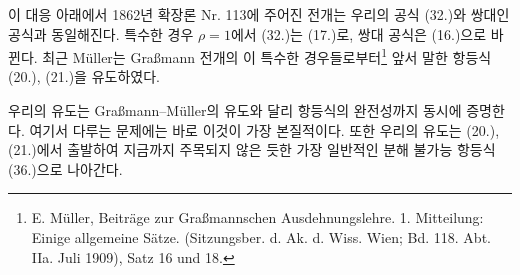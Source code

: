 이 대응 아래에서 1862년 확장론 Nr. 113에 주어진 전개는 우리의 공식 (32.)와 쌍대인 공식과 동일해진다. 특수한 경우 $\rho=1$에서 (32.)는 (17.)로, 쌍대 공식은 (16.)으로 바뀐다. 최근 Müller는 Graßmann 전개의 이 특수한 경우들로부터\footnote{E. Müller, Beiträge zur Graßmannschen Ausdehnungslehre. 1. Mitteilung: Einige allgemeine Sätze. (Sitzungsber. d. Ak. d. Wiss. Wien; Bd. 118. Abt. IIa. Juli 1909), Satz 16 und 18.} 앞서 말한 항등식 (20.), (21.)을 유도하였다.

우리의 유도는 Graßmann--Müller의 유도와 달리 항등식의 완전성까지 동시에 증명한다. 여기서 다루는 문제에는 바로 이것이 가장 본질적이다. 또한 우리의 유도는 (20.), (21.)에서 출발하여 지금까지 주목되지 않은 듯한 가장 일반적인 분해 불가능 항등식 (36.)으로 나아간다.
